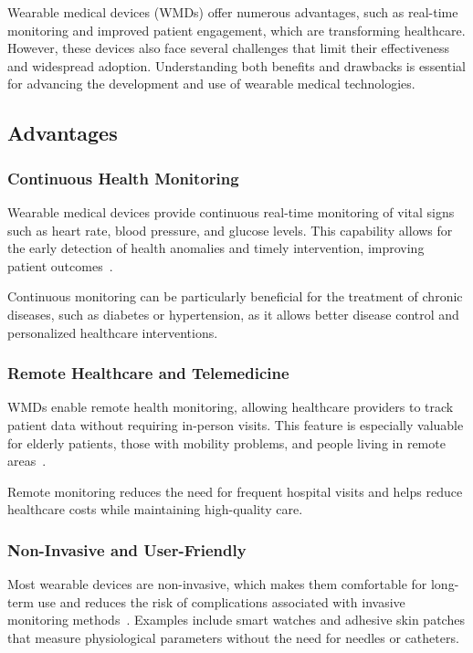 \documentclass[journal]{IEEEtran}
\begin{document}
Wearable medical devices (WMDs) offer numerous advantages, such as real-time monitoring and improved patient engagement, which are transforming healthcare. However, these devices also face several challenges that limit their effectiveness and widespread adoption. Understanding both benefits and drawbacks is essential for advancing the development and use of wearable medical technologies.

    \subsection{Advantages}

        \subsubsection{Continuous Health Monitoring}

        Wearable medical devices provide continuous real-time monitoring of vital signs such as heart rate, blood pressure, and glucose levels. This capability allows for the early detection of health anomalies and timely intervention, improving patient outcomes~\cite{Dias2018}.

        Continuous monitoring can be particularly beneficial for the treatment of chronic diseases, such as diabetes or hypertension, as it allows better disease control and personalized healthcare interventions.

        \subsubsection{Remote Healthcare and Telemedicine}

        WMDs enable remote health monitoring, allowing healthcare providers to track patient data without requiring in-person visits. This feature is especially valuable for elderly patients, those with mobility problems, and people living in remote areas~\cite{Nahavandi2022}.

        Remote monitoring reduces the need for frequent hospital visits and helps reduce healthcare costs while maintaining high-quality care.

        \subsubsection{Non-Invasive and User-Friendly}

        Most wearable devices are non-invasive, which makes them comfortable for long-term use and reduces the risk of complications associated with invasive monitoring methods~\cite{Iqbal2016}. Examples include smart watches and adhesive skin patches that measure physiological parameters without the need for needles or catheters.
\end{document}
